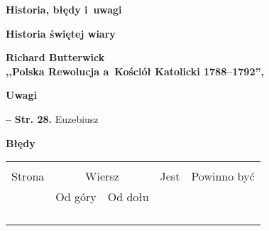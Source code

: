 \documentclass[a4paper,11pt]{article}
\newcommand{\spaceOne}{2em}
\newcommand{\spaceTwo}{1em}
\newcommand{\spaceThree}{0.5em}
\newcommand{\tb}{\textbf}
\newcommand{\noi}{\noindent}
\newcommand{\start}{\noi \tb{--} {}}
\newcommand{\Center}[1]{\begin{center} #1 \end{center}}
\newcommand{\CenterTB}[1]{\Center{\tb{#1}}}
\newcommand{\Str}[1]{\tb{Str. #1.}}
\newcommand{\StrWd}[2]{\tb{Str. #1, wiersz #2 (od dołu).}}
\newcommand{\Main}[1]{ \begin{center} {\LARGE \tb{#1} } \end{center} }
\newcommand{\Field}[1]{ \begin{center} {\Large \tb{#1} } \end{center} }
\newcommand{\Work}[1]{ \begin{center} {\large \tb{#1}} \end{center} }
\begin{document}



\Main{Historia, błędy i~uwagi}

\vspace{\spaceTwo}




\Field{Historia świętej wiary}

\vspace{\spaceThree}



\Work{
  Richard Butterwick \\
  ,,Polska Rewolucja a~Kościół Katolicki 1788--1792'', \cite{But12} }


\CenterTB{Uwagi}

\start \Str{28} Euzebiusz \\


\CenterTB{Błędy}
\begin{center}
  \begin{tabular}{|c|c|c|c|c|}
    \hline
    & \multicolumn{2}{c|}{} & & \\
    Strona & \multicolumn{2}{c|}{Wiersz}& Jest & Powinno być \\ \cline{2-3}
    & Od góry & Od dołu &  &  \\ \hline
    & & & & \\
    & & & & \\
    & & & & \\
    & & & & \\ \hline
  \end{tabular}
\end{center}

\vspace{\spaceOne}
\end{document}
